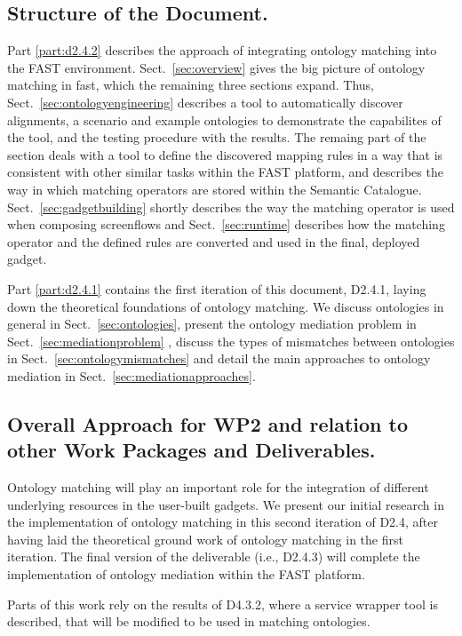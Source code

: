 \documentclass{fast_latex}
\begin{document}
\subsection{Structure of the Document.}
Part \ref{part:d2.4.2} describes the approach of integrating ontology matching into the FAST environment. Sect.~\ref{sec:overview} gives the big picture of ontology matching in fast, which the remaining three sections expand. Thus, Sect.~\ref{sec:ontologyengineering} describes a tool to automatically discover alignments, a scenario and example ontologies to demonstrate the capabilites of the tool, and the testing procedure with the results. The remaing part of the section deals with a tool to define the discovered mapping rules in a way that is consistent with other similar tasks within the FAST platform, and describes the way in which matching operators are stored within the Semantic Catalogue. Sect.~\ref{sec:gadgetbuilding} shortly describes the way the matching operator is used when composing screenflows and Sect.~\ref{sec:runtime} describes how the matching operator and the defined rules are converted and used in the final, deployed gadget.

Part \ref{part:d2.4.1} contains the first iteration of this document, D2.4.1, laying down the theoretical foundations of ontology matching. We discuss ontologies in general in Sect.~\ref{sec:ontologies}, present the ontology mediation problem in Sect.~\ref{sec:mediationproblem} , discuss the types  of mismatches between ontologies in Sect.~\ref{sec:ontologymismatches} and detail the main approaches to ontology mediation in Sect.~\ref{sec:mediationapproaches}.

\subsection{Overall Approach for WP2 and relation to other Work Packages and Deliverables.}
Ontology matching will play an important role for the integration of different underlying resources in the user-built gadgets. 
We present our initial research in the implementation of ontology matching in this second iteration of D2.4, after having laid the theoretical ground work of ontology matching in the first iteration. The final version of the deliverable (i.e., D2.4.3) will complete the implementation of ontology mediation within the FAST platform. 

Parts of this work rely on the results of D4.3.2, where a service wrapper tool is described, that will be modified to be used in matching ontologies.
\end{document}
